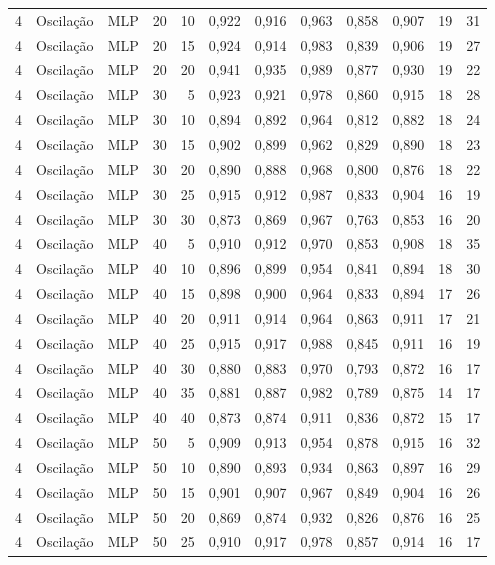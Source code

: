 \begin{longtable}{@{}rllrrrrrrrrr@{}}
4 & Oscilação & MLP & 20 & 10 & 0,922 & 0,916 & 0,963 & 0,858 & 0,907 & 19 & 31 \\
4 & Oscilação & MLP & 20 & 15 & 0,924 & 0,914 & 0,983 & 0,839 & 0,906 & 19 & 27 \\
4 & Oscilação & MLP & 20 & 20 & 0,941 & 0,935 & 0,989 & 0,877 & 0,930 & 19 & 22 \\
4 & Oscilação & MLP & 30 & 5 & 0,923 & 0,921 & 0,978 & 0,860 & 0,915 & 18 & 28 \\
4 & Oscilação & MLP & 30 & 10 & 0,894 & 0,892 & 0,964 & 0,812 & 0,882 & 18 & 24 \\
4 & Oscilação & MLP & 30 & 15 & 0,902 & 0,899 & 0,962 & 0,829 & 0,890 & 18 & 23 \\
4 & Oscilação & MLP & 30 & 20 & 0,890 & 0,888 & 0,968 & 0,800 & 0,876 & 18 & 22 \\
4 & Oscilação & MLP & 30 & 25 & 0,915 & 0,912 & 0,987 & 0,833 & 0,904 & 16 & 19 \\
4 & Oscilação & MLP & 30 & 30 & 0,873 & 0,869 & 0,967 & 0,763 & 0,853 & 16 & 20 \\
4 & Oscilação & MLP & 40 & 5 & 0,910 & 0,912 & 0,970 & 0,853 & 0,908 & 18 & 35 \\
4 & Oscilação & MLP & 40 & 10 & 0,896 & 0,899 & 0,954 & 0,841 & 0,894 & 18 & 30 \\
4 & Oscilação & MLP & 40 & 15 & 0,898 & 0,900 & 0,964 & 0,833 & 0,894 & 17 & 26 \\
4 & Oscilação & MLP & 40 & 20 & 0,911 & 0,914 & 0,964 & 0,863 & 0,911 & 17 & 21 \\
4 & Oscilação & MLP & 40 & 25 & 0,915 & 0,917 & 0,988 & 0,845 & 0,911 & 16 & 19 \\
4 & Oscilação & MLP & 40 & 30 & 0,880 & 0,883 & 0,970 & 0,793 & 0,872 & 16 & 17 \\
4 & Oscilação & MLP & 40 & 35 & 0,881 & 0,887 & 0,982 & 0,789 & 0,875 & 14 & 17 \\
4 & Oscilação & MLP & 40 & 40 & 0,873 & 0,874 & 0,911 & 0,836 & 0,872 & 15 & 17 \\
4 & Oscilação & MLP & 50 & 5 & 0,909 & 0,913 & 0,954 & 0,878 & 0,915 & 16 & 32 \\
4 & Oscilação & MLP & 50 & 10 & 0,890 & 0,893 & 0,934 & 0,863 & 0,897 & 16 & 29 \\
4 & Oscilação & MLP & 50 & 15 & 0,901 & 0,907 & 0,967 & 0,849 & 0,904 & 16 & 26 \\
4 & Oscilação & MLP & 50 & 20 & 0,869 & 0,874 & 0,932 & 0,826 & 0,876 & 16 & 25 \\
4 & Oscilação & MLP & 50 & 25 & 0,910 & 0,917 & 0,978 & 0,857 & 0,914 & 16 & 17 \\

\end{longtable}
